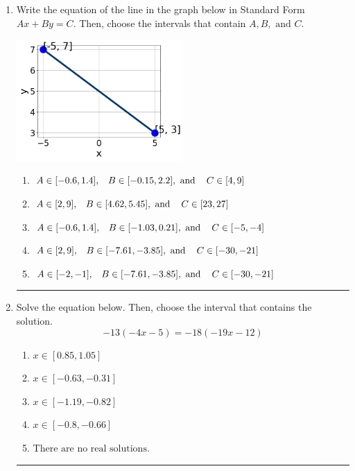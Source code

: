 \documentclass[14pt]{extbook}
\newcommand{\litem}[1]{\item#1\hspace*{-1cm}\rule{\textwidth}{0.4pt}}
\begin{document}
\begin{enumerate}
{\begin{enumerate}[label=\Alph*.]
\end{enumerate} }
\litem{
Write the equation of the line in the graph below in Standard Form $Ax+By=C$. Then, choose the intervals that contain $A, B, \text{ and } C$.
\begin{center}
    \includegraphics[width=0.5\textwidth]{../Figures/linearGraphToStandardA.png}
\end{center}
\begin{enumerate}[label=\Alph*.]
\item \( A \in [-0.6, 1.4], \hspace{3mm} B \in [-0.15, 2.2], \text{ and } \hspace{3mm} C \in [4, 9] \)
\item \( A \in [2, 9], \hspace{3mm} B \in [4.62, 5.45], \text{ and } \hspace{3mm} C \in [23, 27] \)
\item \( A \in [-0.6, 1.4], \hspace{3mm} B \in [-1.03, 0.21], \text{ and } \hspace{3mm} C \in [-5, -4] \)
\item \( A \in [2, 9], \hspace{3mm} B \in [-7.61, -3.85], \text{ and } \hspace{3mm} C \in [-30, -21] \)
\item \( A \in [-2, -1], \hspace{3mm} B \in [-7.61, -3.85], \text{ and } \hspace{3mm} C \in [-30, -21] \)

\end{enumerate} }
\litem{
Solve the equation below. Then, choose the interval that contains the solution.\[ -13(-4x -5) = -18(-19x -12) \]\begin{enumerate}[label=\Alph*.]
\item \( x \in [0.85, 1.05] \)
\item \( x \in [-0.63, -0.31] \)
\item \( x \in [-1.19, -0.82] \)
\item \( x \in [-0.8, -0.66] \)
\item \( \text{There are no real solutions.} \)


\end{enumerate}}
\end{enumerate}
\end{document}
